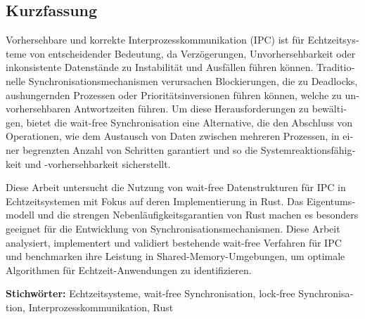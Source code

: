\cleardoublepage

\begin{otherlanguage}{ngerman}
\chapter*{Kurzfassung}


Vorhersehbare und korrekte Interprozesskommunikation (IPC) ist für Echtzeitsysteme von entscheidender Bedeutung, da Verzögerungen, Unvorhersehbarkeit oder inkonsistente Datenstände zu Instabilität und Ausfällen führen können. Traditionelle Synchronisationsmechanismen verursachen Blockierungen, die zu Deadlocks, aushungernden Prozessen oder Prioritätsinversionen führen können, welche zu unvorhersehbaren Antwortzeiten führen. Um diese Herausforderungen zu bewältigen, bietet die wait-free Synchronisation eine Alternative, die den Abschluss von Operationen, wie dem Austausch von Daten zwischen mehreren Prozessen, in einer begrenzten Anzahl von Schritten garantiert und so die Systemreaktionsfähigkeit und -vorhersehbarkeit sicherstellt.

Diese Arbeit untersucht die Nutzung von wait-free Datenstrukturen für IPC in Echtzeitsystemen mit Fokus auf deren Implementierung in Rust. Das Eigentumsmodell und die strengen Nebenläufigkeitsgarantien von Rust machen es besonders geeignet für die Entwicklung von Synchronisationsmechanismen. Diese Arbeit analysiert, implementert und validiert bestehende wait-free Verfahren für IPC und benchmarken ihre Leistung in Shared-Memory-Umgebungen, um optimale Algorithmen für Echtzeit-Anwendungen zu identifizieren.

\vfill
\noindent\textbf{Stichwörter:} Echtzeitsysteme, wait-free Synchronisation, lock-free Synchronisation, Interprozesskommunikation, Rust
\vfill
\end{otherlanguage}
